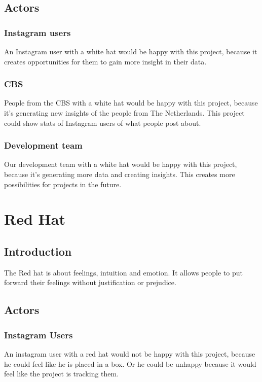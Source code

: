 \documentclass{article}
\begin{document}
    \subsection{Actors}
        \subsubsection{Instagram users}
            An Instagram user with a white hat would be happy with this project, because it creates opportunities for them to gain more insight in their data. 
        
        \subsubsection{CBS}
            People from the CBS with a white hat would be happy with this project, because it's generating new insights of the people from The Netherlands. This project could show stats of Instagram users of what people post about.
            
        \subsubsection{Development team}
            Our development team with a white hat would be happy with this project, because it's generating more data and creating insights. This creates more possibilities for projects in the future. 
\pagebreak

\section{Red Hat}
    \subsection{Introduction}
        The Red hat is about feelings, intuition and emotion. It allows people to put forward their feelings without justification or prejudice.
    
    \subsection{Actors}
        \subsubsection{Instagram Users}
            An instagram user with a red hat would not be happy with this project, because he could feel like he is placed in a box. Or he could be unhappy because it would feel like the project  is tracking them.
        
\end{document}
